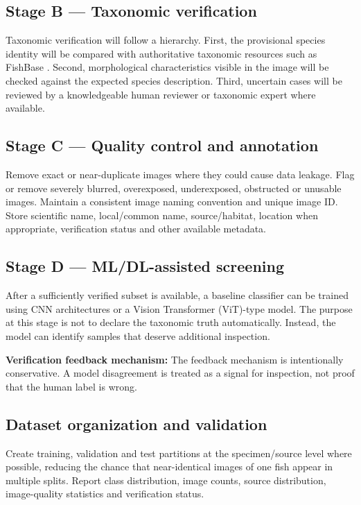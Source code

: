 \documentclass[12pt,a4paper]{article}
\begin{document}
\subsection{Stage B — Taxonomic verification}
Taxonomic verification will follow a hierarchy. First, the provisional species identity will be compared with authoritative taxonomic resources such as FishBase \cite{ref6}. Second, morphological characteristics visible in the image will be checked against the expected species description. Third, uncertain cases will be reviewed by a knowledgeable human reviewer or taxonomic expert where available.

\subsection{Stage C — Quality control and annotation}
Remove exact or near-duplicate images where they could cause data leakage. Flag or remove severely blurred, overexposed, underexposed, obstructed or unusable images. Maintain a consistent image naming convention and unique image ID. Store scientific name, local/common name, source/habitat, location when appropriate, verification status and other available metadata.

\subsection{Stage D — ML/DL-assisted screening}
After a sufficiently verified subset is available, a baseline classifier can be trained using CNN architectures or a Vision Transformer (ViT)-type model. The purpose at this stage is not to declare the taxonomic truth automatically. Instead, the model can identify samples that deserve additional inspection.

\textbf{Verification feedback mechanism:} The feedback mechanism is intentionally conservative. A model disagreement is treated as a signal for inspection, not proof that the human label is wrong.

\subsection{Dataset organization and validation}
Create training, validation and test partitions at the specimen/source level where possible, reducing the chance that near-identical images of one fish appear in multiple splits. Report class distribution, image counts, source distribution, image-quality statistics and verification status.
\end{document}
